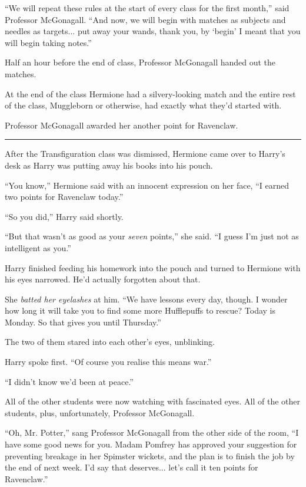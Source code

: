 ``We will repeat these rules at the start of every class for the first
month,'' said Professor McGonagall. ``And now, we will begin with
matches as subjects and needles as targets... put away your wands,
thank you, by `begin' I meant that you will begin taking notes.''

Half an hour before the end of class, Professor McGonagall handed out
the matches.

At the end of the class Hermione had a silvery-looking match and the
entire rest of the class, Muggleborn or otherwise, had exactly what
they'd started with.

Professor McGonagall awarded her another point for Ravenclaw.

\begin{center}\rule{3in}{0.4pt}\end{center}

After the Transfiguration class was dismissed, Hermione came over to
Harry's desk as Harry was putting away his books into his pouch.

``You know,'' Hermione said with an innocent expression on her face, ``I
earned two points for Ravenclaw today.''

``So you did,'' Harry said shortly.

``But that wasn't as good as your \emph{seven} points,'' she said. ``I
guess I'm just not as intelligent as you.''

Harry finished feeding his homework into the pouch and turned to
Hermione with his eyes narrowed. He'd actually forgotten about that.

She \emph{batted her eyelashes} at him. ``We have lessons every day,
though. I wonder how long it will take you to find some more Hufflepuffs
to rescue? Today is Monday. So that gives you until Thursday.''

The two of them stared into each other's eyes, unblinking.

Harry spoke first. ``Of course you realise this means war.''

``I didn't know we'd been at peace.''

All of the other students were now watching with fascinated eyes. All of
the other students, plus, unfortunately, Professor McGonagall.

``Oh, Mr. Potter,'' sang Professor McGonagall from the other side of the
room, ``I have some good news for you. Madam Pomfrey has approved your
suggestion for preventing breakage in her Spimster wickets, and the plan
is to finish the job by the end of next week. I'd say that
deserves... let's call it ten points for Ravenclaw.''

